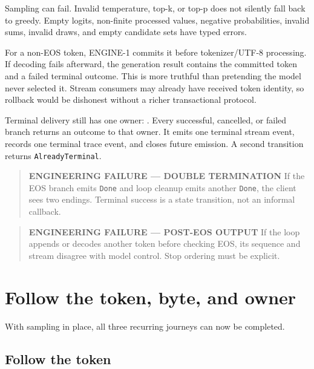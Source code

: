 Sampling can fail. Invalid temperature, top-k, or top-p does not
silently fall back to greedy. Empty logits, non-finite processed values,
negative probabilities, invalid sums, invalid draws, and empty candidate
sets have typed errors.

For a non-EOS token, ENGINE-1 commits it before tokenizer/UTF-8
processing. If decoding fails afterward, the generation result contains
the committed token and a failed terminal outcome. This is more truthful
than pretending the model never selected it. Stream consumers may
already have received token identity, so rollback would be dishonest
without a richer transactional protocol.

Terminal delivery still has one owner:
\texttt{}. Every successful, cancelled, or
failed branch returns an outcome to that owner. It emits one terminal
stream event, records one terminal trace event, and closes future
emission. A second transition returns \texttt{AlreadyTerminal}.

\begin{quote}
\textbf{ENGINEERING FAILURE --- DOUBLE TERMINATION} If the EOS branch
emits \texttt{Done} and loop cleanup emits another \texttt{Done}, the
client sees two endings. Terminal success is a state transition, not an
informal callback.
\end{quote}

\begin{quote}
\textbf{ENGINEERING FAILURE --- POST-EOS OUTPUT} If the loop appends or
decodes another token before checking EOS, its sequence and stream
disagree with model control. Stop ordering must be explicit.
\end{quote}

\section{Follow the token, byte, and
owner}\label{follow-the-token-byte-and-owner-1}

With sampling in place, all three recurring journeys can now be completed.

\subsection{Follow the token}\label{follow-the-token-1}

